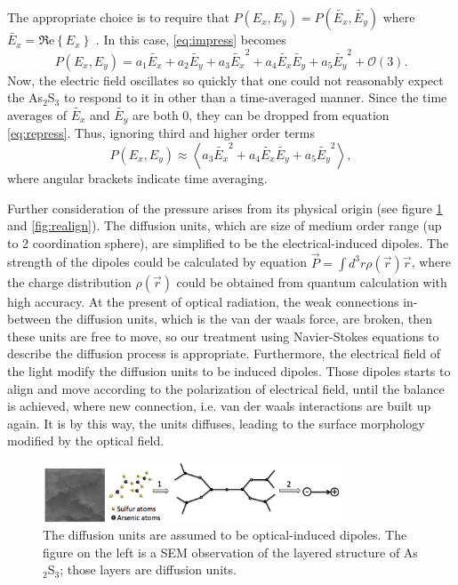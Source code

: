 \documentclass[twocolumn,showpacs,preprintnumbers,amsmath,amssymb]{revtex4}
\begin{document}
The appropriate choice is to require that
$P(E_x,E_y)=P(\tilde{E_x},\tilde{E_y})$ where
$\tilde{E_x}=\Re\mathrm{e}\left\{E_x\right\}$ \cite{recht06}. In this
case,
\ref{eq:impress} becomes
\begin{equation}
P(E_x,E_y)=a_1\tilde{E_x}+a_2\tilde{E_y}+a_3\tilde{E_x}^2+a_4\tilde{E_x}\tilde{E_y}+a_5\tilde{E_y}^2+\mathcal{O}(3)
\mathrm{.} \label{eq:repress}
\end{equation}
Now, the electric field oscillates so quickly that one could not
reasonably expect the As$_2$S$_3$ to respond to it in other than a
time-averaged manner. Since the time averages of $\tilde{E_x}$ and
$\tilde{E_y}$ are both 0, they can be dropped from equation
\ref{eq:repress}. Thus, ignoring third and higher order terms
\begin{equation}
P(E_x,E_y) \approx \left\langle
a_3\tilde{E_x}^2+a_4\tilde{E_x}\tilde{E_y}+a_5\tilde{E_y}^2\right\rangle \mathrm{,}
\label{eq:repress2}
\end{equation}
where angular brackets indicate time averaging.

Further consideration of the pressure arises from its physical origin
(see figure \ref{fig:diffusion} and \ref{fig:realign}). The
diffusion units, which are size of medium order range (up to 2
coordination sphere), are simplified to be the electrical-induced
dipoles. The strength of the dipoles could be calculated by equation
$\vec{P} = \int d^3 r \rho(\vec{r}) \vec{r}$, where the charge
distribution $\rho(\vec{r})$ could be obtained from quantum
calculation with high accuracy. At the present of optical radiation,
the weak connections in-between the diffusion units, which is the van
der waals force, are broken, then these units are free to move, so our
treatment using Navier-Stokes equations to describe the diffusion
process is appropriate. Furthermore, the electrical field of the light
modify the diffusion units to be induced dipoles. Those dipoles starts
to align and move according to the polarization of electrical field,
until the balance is achieved, where new connection, i.e. van der
waals interactions are built up again. It is by this way, the units
diffuses, leading to the surface morphology modified by the optical
field.

\begin{figure}[!htbp]
  \includegraphics[width=3.5in]{figure/dipole.png}
  \caption{The diffusion units are assumed to be optical-induced
                                dipoles. The figure on the left is a SEM observation of the
                                layered structure of As$_2$S$_3$; those layers are diffusion
                                units.}
  \label{fig:diffusion}
\end{figure}
\end{document}
